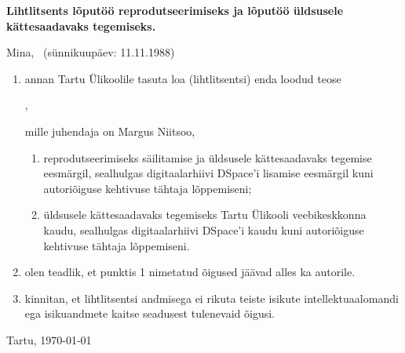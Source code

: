 \documentclass[a4paper,12pt,oneside]{article}
\numberwithin{equation}{section}
\theoremstyle{definition}
\begin{document}
\textbf{Lihtlitsents lõputöö reprodutseerimiseks ja
lõputöö üldsusele kätte\-saadavaks tegemiseks.}


Mina, \@author\ (sünnikuupäev: 11.11.1988)
\begin{enumerate}
\item annan Tartu Ülikoolile tasuta loa (lihtlitsentsi)
enda loodud teose
\begin{center}
\@title,
\end{center}
mille juhendaja on Margus Niitsoo,
\begin{enumerate}
\item reprodutseerimiseks säilitamise ja üldsusele
kättesaadavaks tegemise eesmärgil, sealhulgas
digitaalarhiivi DSpace'i lisamise eesmärgil kuni
autoriõiguse kehtivuse tähtaja lõppemiseni;
\item üldsusele kättesaadavaks tegemiseks Tartu Ülikooli
veebikeskkonna kaudu, sealhulgas digitaalarhiivi
DSpace'i kaudu kuni autoriõiguse kehti\-vuse tähtaja lõppemiseni.
\end{enumerate}
\item olen teadlik, et punktis 1 nimetatud õigused jäävad
alles ka autorile.
\item kinnitan, et lihtlitsentsi andmisega ei rikuta teiste
isikute intellektuaal\-o\-mandi ega isikuandmete kaitse
seadusest tulenevaid õigusi.
\end{enumerate}

\vfill

\begin{center}
Tartu,  \today
\end{center}
\makeatother
\end{document}
